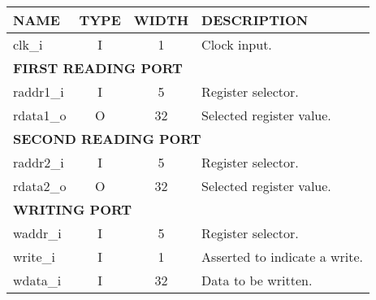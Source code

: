 {
\footnotesize
\begin{tabularx}{0.9\textwidth}{|l|c|c|X|}
  \hline
  \cellcolor{gray!20}\textbf{NAME} & \cellcolor{gray!20}\textbf{TYPE} & \cellcolor{gray!20}\textbf{WIDTH} & \cellcolor{gray!20}\textbf{DESCRIPTION} \\
  \hline
  clk\_i & I & 1 & Clock input. \\
  \hline
  \multicolumn{4}{|l|}{\textbf{FIRST READING PORT}} \\
  \hline
  raddr1\_i & I & 5 & Register selector. \\
  \hline
  rdata1\_o & O & 32 & Selected register value. \\
  \hline
  \multicolumn{4}{|l|}{\textbf{SECOND READING PORT}} \\
  \hline
  raddr2\_i & I & 5 & Register selector. \\
  \hline
  rdata2\_o & O & 32 & Selected register value. \\
  \hline
  \multicolumn{4}{|l|}{\textbf{WRITING PORT}} \\
  \hline
  waddr\_i & I & 5 & Register selector. \\
  \hline
  write\_i & I & 1 & Asserted to indicate a write. \\
  \hline
  wdata\_i & I & 32 & Data to be written. \\
  \hline
\end{tabularx}
}
